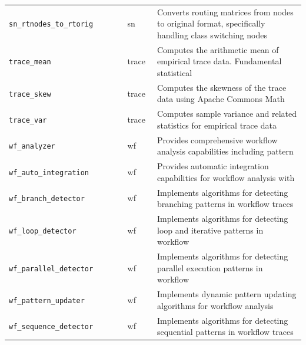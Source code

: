 \begin{footnotesize}
\begin{longtable}{|p{0.4\linewidth}|p{0.1\linewidth}|p{0.5\linewidth}|}
\texttt{sn\_rtnodes\_to\_rtorig} & sn & Converts routing matrices from nodes to original format, specifically handling class switching nodes\\
\texttt{trace\_mean} & trace & Computes the arithmetic mean of empirical trace data. Fundamental statistical\\
\texttt{trace\_skew} & trace & Computes the skewness of the trace data using Apache Commons Math\\
\texttt{trace\_var} & trace & Computes sample variance and related statistics for empirical trace data\\
\texttt{wf\_analyzer} & wf & Provides comprehensive workflow analysis capabilities including pattern\\
\texttt{wf\_auto\_integration} & wf & Provides automatic integration capabilities for workflow analysis with\\
\texttt{wf\_branch\_detector} & wf & Implements algorithms for detecting branching patterns in workflow traces\\
\texttt{wf\_loop\_detector} & wf & Implements algorithms for detecting loop and iterative patterns in workflow\\
\texttt{wf\_parallel\_detector} & wf & Implements algorithms for detecting parallel execution patterns in workflow\\
\texttt{wf\_pattern\_updater} & wf & Implements dynamic pattern updating algorithms for workflow analysis\\
\texttt{wf\_sequence\_detector} & wf & Implements algorithms for detecting sequential patterns in workflow traces\\
\end{longtable}
\end{footnotesize}
